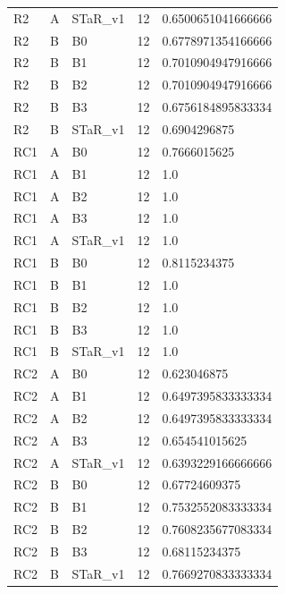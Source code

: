 \begin{tabular}{lllll}
 R2 & A & STaR\_v1 & 12 & 0.6500651041666666 \\
 R2 & B & B0 & 12 & 0.6778971354166666 \\
 R2 & B & B1 & 12 & 0.7010904947916666 \\
 R2 & B & B2 & 12 & 0.7010904947916666 \\
 R2 & B & B3 & 12 & 0.6756184895833334 \\
 R2 & B & STaR\_v1 & 12 & 0.6904296875 \\
 RC1 & A & B0 & 12 & 0.7666015625 \\
 RC1 & A & B1 & 12 & 1.0 \\
 RC1 & A & B2 & 12 & 1.0 \\
 RC1 & A & B3 & 12 & 1.0 \\
 RC1 & A & STaR\_v1 & 12 & 1.0 \\
 RC1 & B & B0 & 12 & 0.8115234375 \\
 RC1 & B & B1 & 12 & 1.0 \\
 RC1 & B & B2 & 12 & 1.0 \\
 RC1 & B & B3 & 12 & 1.0 \\
 RC1 & B & STaR\_v1 & 12 & 1.0 \\
 RC2 & A & B0 & 12 & 0.623046875 \\
 RC2 & A & B1 & 12 & 0.6497395833333334 \\
 RC2 & A & B2 & 12 & 0.6497395833333334 \\
 RC2 & A & B3 & 12 & 0.654541015625 \\
 RC2 & A & STaR\_v1 & 12 & 0.6393229166666666 \\
 RC2 & B & B0 & 12 & 0.67724609375 \\
 RC2 & B & B1 & 12 & 0.7532552083333334 \\
 RC2 & B & B2 & 12 & 0.7608235677083334 \\
 RC2 & B & B3 & 12 & 0.68115234375 \\
 RC2 & B & STaR\_v1 & 12 & 0.7669270833333334 \\
 \hline
\end{tabular}
